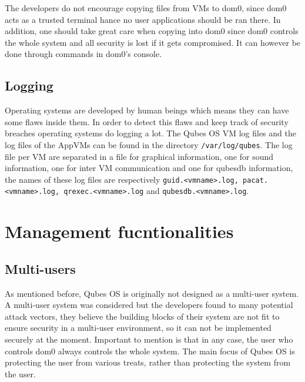 \documentclass[runningheads,a4paper]{article}
\begin{document}
The developers do not encourage copying files from VMs to dom0, since
dom0 acts as a trusted terminal hance no user applications should be
ran there.  In addition, one should take great care when copying into
dom0 since dom0 controls the whole system and all security is lost if
it gets compromised.  It can however be done through commands in dom0's console.  

\subsection{Logging}

Operating systems are developed by human beings which means they can
have some flaws inside them. In order to detect this flaws and keep
track of security breaches operating systems do logging a lot. The
Qubes OS VM log files and the log files of the AppVMs can be found in
the directory \texttt{/var/log/qubes}. The log file per VM are
separated in a file for graphical information, one for sound
information, one for inter VM communication and one for qubesdb
information, the names of these log files are respectively
\texttt{guid.<vmname>.log, pacat.<vmname>.log, qrexec.<vmname>.log}
and \texttt{qubesdb.<vmname>.log}.

\section{Management fucntionalities}
\subsection{Multi-users} 

As mentioned before, Qubes OS is originally
not designed as a multi-user system.  A multi-user system was
considered but the developers found to many potential attack vectors,
they believe the building blocks of their system are not fit to ensure
security in a multi-user environment, so it can not be implemented
securely at the moment. Important to mention is that in any case, the
user who controls dom0 always controls the whole system. The main
focus of Qubes OS is protecting the user from various treats, rather
than protecting the system from the user.
\end{document}
